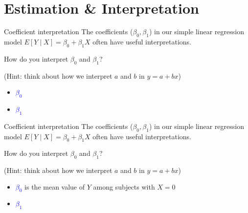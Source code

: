 \documentclass[10pt,t]{beamer}
\begin{document}
\section{Estimation \& Interpretation}


\begin{frame}{Coefficient interpretation}
The coefficients ($\beta_0, \beta_1$) in our simple linear regression model $E[Y \mid X] = \beta_0 + \beta_1 X$ often have useful interpretations.

\vspace{0.3cm} 

How do you interpret $\beta_0$ and $\beta_1$?

\vspace{0.3cm} 

\small (Hint: think about how we interpret $a$ and $b$ in $y = a + bx$)

\normalsize 
\vspace{0.3cm} 

\begin{itemize}
	\item \textcolor{blue}{$\beta_0$} 
	\item \textcolor{blue}{$\beta_1$} 
\end{itemize}

\end{frame}

\begin{frame}{Coefficient interpretation}
The coefficients ($\beta_0, \beta_1$) in our simple linear regression model $E[Y \mid X] = \beta_0 + \beta_1 X$ often have useful interpretations.

\vspace{0.3cm} 

How do you interpret $\beta_0$ and $\beta_1$?

\vspace{0.3cm} 

\small (Hint: think about how we interpret $a$ and $b$ in $y = a + bx$)
\normalsize 
\vspace{0.3cm} 

\begin{itemize}
	\item \textcolor{blue}{$\beta_0$} is the mean value of $Y$ among subjects with $X = 0$
	\item \textcolor{blue}{$\beta_1$} 
\end{itemize}

\end{frame}
\end{document}
